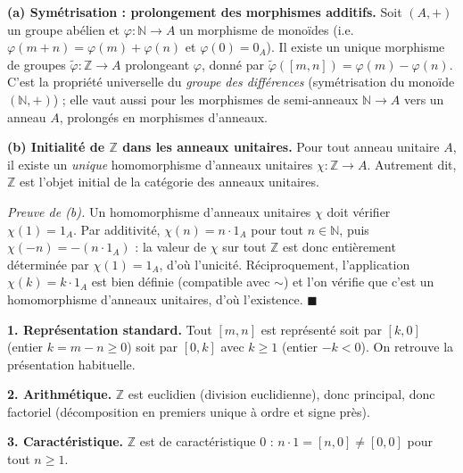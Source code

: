 \begin{tcolorbox}[thmbox]
  \textbf{(a) Symétrisation : prolongement des morphismes additifs.}\enspace%
  Soit $(A,+)$ un groupe abélien et $\varphi : \mathbb{N} \to A$ un morphisme
  de monoïdes (i.e.\ $\varphi(m+n)=\varphi(m)+\varphi(n)$ et $\varphi(0)=0_A$).
  Il existe un unique morphisme de groupes $\tilde\varphi : \mathbb{Z} \to A$
  prolongeant $\varphi$, donné par $\tilde\varphi([m,n]) = \varphi(m) - \varphi(n)$.
  C'est la propriété universelle du \emph{groupe des différences} (symétrisation
  du monoïde $(\mathbb{N},+)$) ; elle vaut aussi pour les morphismes de
  semi-anneaux $\mathbb{N}\to A$ vers un anneau $A$, prolongés en morphismes
  d'anneaux.

  \smallskip
  \textbf{(b) Initialité de $\mathbb{Z}$ dans les anneaux unitaires.}\enspace%
  Pour tout anneau unitaire $A$, il existe un \emph{unique} homomorphisme
  d'anneaux unitaires $\chi : \mathbb{Z} \to A$. Autrement dit, $\mathbb{Z}$ est
  l'objet initial de la catégorie des anneaux unitaires.
\end{tcolorbox}

\begin{mdframed}[style=proofbar]
  \textit{Preuve de (b).} Un homomorphisme d'anneaux unitaires $\chi$ doit
  vérifier $\chi(1)=1_A$. Par additivité, $\chi(n)=n\cdot 1_A$ pour tout
  $n\in\mathbb{N}$, puis $\chi(-n)=-(n\cdot 1_A)$ : la valeur de $\chi$ sur tout
  $\mathbb{Z}$ est donc entièrement déterminée par $\chi(1)=1_A$, d'où
  l'unicité. Réciproquement, l'application $\chi(k)=k\cdot 1_A$ est bien définie
  (compatible avec $\sim$) et l'on vérifie que c'est un homomorphisme d'anneaux
  unitaires, d'où l'existence. $\blacksquare$
\end{mdframed}

\decsep{}



\begin{mdframed}[style=exbar]
  \textbf{1. Représentation standard.}\enspace%
  Tout $[m,n]$ est représenté soit par $[k,0]$ (entier $k = m-n \geq 0$)
  soit par $[0,k]$ avec $k \geq 1$ (entier $-k < 0$). On retrouve la
  présentation habituelle.

  \smallskip\noindent
  \textbf{2. Arithmétique.}\enspace%
  $\mathbb{Z}$ est euclidien (division euclidienne), donc principal, donc
  factoriel (décomposition en premiers unique à ordre et signe près).

  \smallskip\noindent
  \textbf{3. Caractéristique.}\enspace%
  $\mathbb{Z}$ est de caractéristique $0$ : $n \cdot 1 = [n,0] \neq [0,0]$
  pour tout $n \geq 1$.
\end{mdframed}

